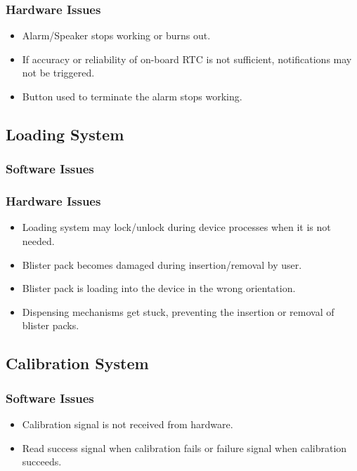 \documentclass[12pt,titlepage]{article}
\begin{document}
\subsubsection*{Hardware Issues}
\begin{itemize}
\item Alarm/Speaker stops working or burns out.
\item If accuracy or reliability of on-board RTC is not sufficient, notifications may not be triggered.
\item Button used to terminate the alarm stops working.
\end{itemize}

\subsection{Loading System}
\subsubsection*{Software Issues}
\subsubsection*{Hardware Issues}
\begin{itemize}
\item Loading system may lock/unlock during device processes when it is not needed.
\item Blister pack becomes damaged during insertion/removal by user. 
\item Blister pack is loading into the device in the wrong orientation.
\item Dispensing mechanisms get stuck, preventing the insertion or removal of blister packs.
\end{itemize}

\subsection{Calibration System}
\subsubsection*{Software Issues}
\begin{itemize}
\item Calibration signal is not received from hardware.
\item Read success signal when calibration fails or failure signal when calibration succeeds.
\end{itemize}
\end{document}
